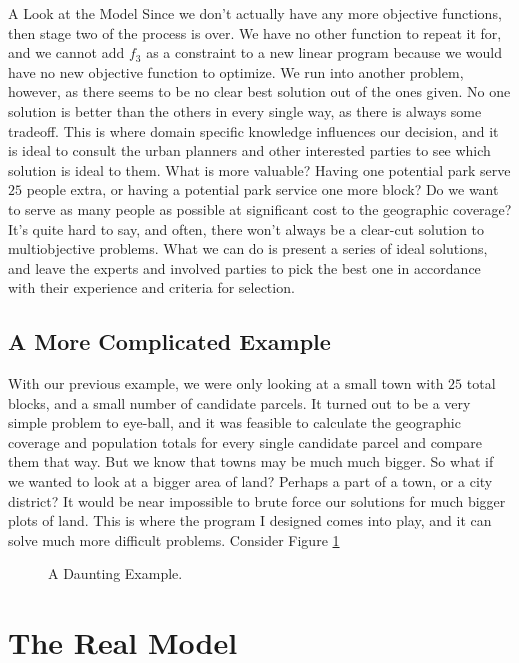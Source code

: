 \documentclass[12pt]{pom_thesis}
\theoremstyle{definition}
\begin{document}
\begin{chapter}{A Look at the Model}
Since we don't actually have any more objective functions, then stage two of the process is over. We have no other function to repeat it for, and we cannot add $f_3$ as a constraint to a new linear program because we would have no new objective function to optimize. We run into another problem, however, as there seems to be no clear best solution out of the ones given. No one solution is better than the others in every single way, as there is always some tradeoff. This is where domain specific knowledge influences our decision, and it is ideal to consult the urban planners and other interested parties to see which solution is ideal to them. What is more valuable? Having one potential park serve $25$ people extra, or having a potential park service one more block? Do we want to serve as many people as possible at significant cost to the geographic coverage? It's quite hard to say, and often, there won't always be a clear-cut solution to multiobjective problems. What we can do is present a series of ideal solutions, and leave the experts and involved parties to pick the best one in accordance with their experience and criteria for selection.
%
%
%
\subsection{A More Complicated Example}

With our previous example, we were only looking at a small town with $25$ total blocks, and a small number of candidate parcels. It turned out to be a very simple problem to eye-ball, and it was feasible to calculate the geographic coverage and population totals for every single candidate parcel and compare them that way. But we know that towns may be much much bigger. So what if we wanted to look at a bigger area of land? Perhaps a part of a town, or a city district? It would be near impossible to brute force our solutions for much bigger plots of land. This is where the program I designed comes into play, and it can solve much more difficult problems. Consider Figure \ref{bigexample}


\begin{figure}
\centering
\caption{A Daunting Example.}
\label{bigexample}
\end{figure}
%
%
\section{The Real Model}


\end{chapter}
\end{document}
